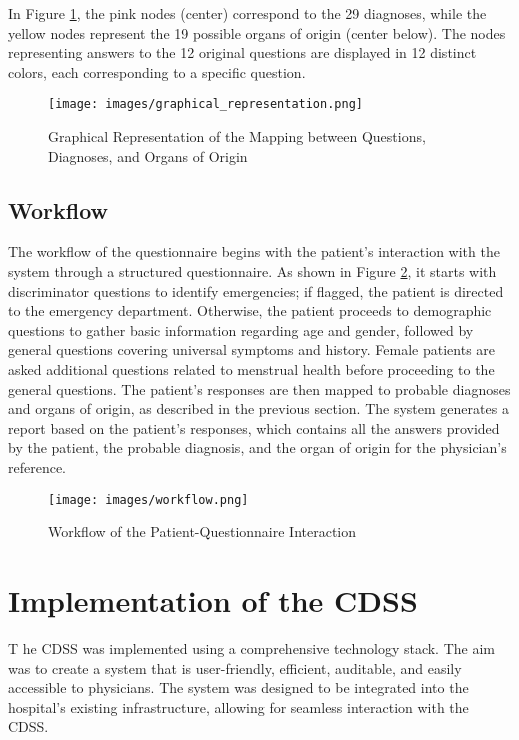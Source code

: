 \noindent In Figure \ref{fig:graphical_representation}, the pink nodes (center) correspond to the 29 diagnoses, while the yellow nodes represent the 19 possible organs of origin (center below). The nodes representing answers to the 12 original questions are displayed in 12 distinct colors, each corresponding to a specific question.

\begin{figure}[H]
    \centering
    \texttt{[image: images/graphical\_representation.png]}
    \caption{Graphical Representation of the Mapping between Questions, Diagnoses, and Organs of Origin}
    \label{fig:graphical_representation}
\end{figure}

\subsection{Workflow}
The workflow of the questionnaire begins with the patient's interaction with the system through a structured questionnaire. As shown in Figure \ref{fig:workflow}, it starts with discriminator questions to identify emergencies; if flagged, the patient is directed to the emergency department. Otherwise, the patient proceeds to demographic questions to gather basic information regarding age and gender, followed by general questions covering universal symptoms and history. Female patients are asked additional questions related to menstrual health before proceeding to the general questions. The patient's responses are then mapped to probable diagnoses and organs of origin, as described in the previous section. The system generates a report based on the patient's responses, which contains all the answers provided by the patient, the probable diagnosis, and the organ of origin for the physician's reference.
\begin{figure}[h]
    \centering
    \texttt{[image: images/workflow.png]}
    \caption{Workflow of the Patient-Questionnaire Interaction}
    \label{fig:workflow}
\end{figure}

\section{Implementation of the CDSS}
\lettrine{T}{ }he CDSS was implemented using a comprehensive technology stack. The aim was to create a system that is user-friendly, efficient, auditable, and easily accessible to physicians. The system was designed to be integrated into the hospital's existing infrastructure, allowing for seamless interaction with the CDSS.\\[\baselineskip]

